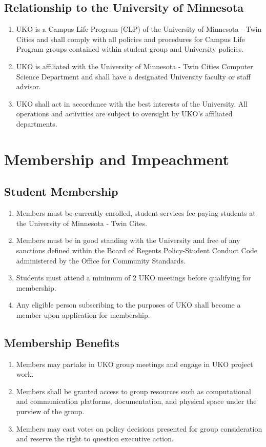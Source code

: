 \documentclass[12pt,executivepaper]{article}
\begin{document}
\subsection{Relationship to the University of Minnesota}
\begin{enumerate}
    \item UKO is a Campus Life Program (CLP) of the University of Minnesota -
          Twin Cities and shall comply with all policies and procedures for
          Campus Life Program groups contained within student group and
          University policies.
    \item UKO is affiliated with the University of Minnesota - Twin Cities
          Computer Science Department and shall have a designated University
          faculty or staff advisor.
    \item UKO shall act in accordance with the best interests of the
          University. All operations and activities are subject to oversight
          by UKO's affiliated departments.
\end{enumerate}

\section{Membership and Impeachment}

\subsection{Student Membership}
\begin{enumerate}
    \item Members must be currently enrolled, student services fee paying students at the
          University of Minnesota - Twin Cites.
    \item Members must be in good standing with the University and free of any sanctions defined
          within the Board of Regents Policy-Student Conduct Code administered by the Office
          for Community Standards.
    \item Students must attend a minimum of 2 UKO meetings before qualifying for
          membership.
    \item Any eligible person subscribing to the purposes of UKO shall become a
          member upon application for membership.
\end{enumerate}

\subsection{Membership Benefits}
\begin{enumerate}
    \item Members may partake in UKO group meetings and engage in UKO project work.
    \item Members shall be granted access to group resources such as computational
          and communication platforms, documentation, and physical space under the
          purview of the group.
    \item Members may cast votes on policy decisions presented for group consideration
          and reserve the right to question executive action.
\end{enumerate}
\end{document}
